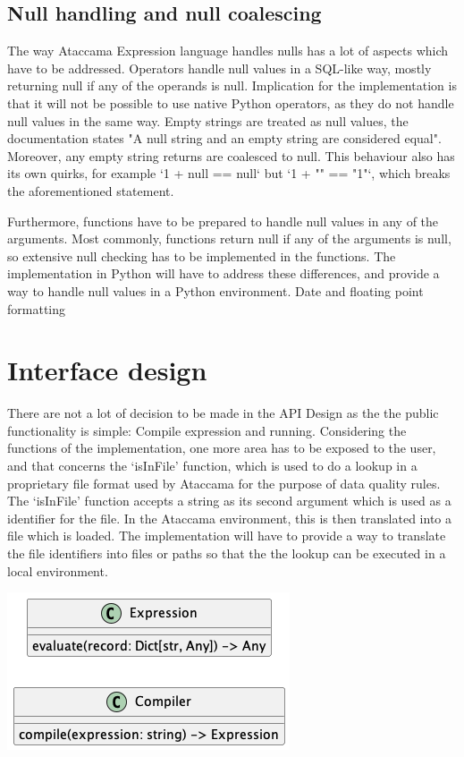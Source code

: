 \subsection{Null handling and null coalescing}
The way Ataccama Expression language handles nulls has a lot of aspects
which have to be addressed.
Operators handle null values in a SQL-like way, mostly returning null if any
of the operands is null. Implication for the implementation is that it will not be
possible to use native Python operators, as they do not handle null values in the
same way.
Empty strings are treated as null values, the documentation states "A null
string and an empty string are considered equal". Moreover, any empty string
returns are coalesced to null. This behaviour also has its own quirks, for example
‘1 + null == null‘ but ‘1 + "" == "1"‘, which breaks the aforementioned statement.

Furthermore, functions have to be prepared to handle null values in any of the
arguments. Most commonly, functions return null if any of the arguments is null,
so extensive null checking has to be implemented in the functions.
The implementation in Python will have to address these differences, and
provide a way to handle null values in a Python environment.
Date and floating point formatting

\section{Interface design}

There are not a lot of decision to be made in the API Design as the the public
functionality is simple: Compile expression and running.
Considering the functions of the implementation, one more area has to be
exposed to the user, and that concerns the ‘isInFile’ function, which is used to
do a lookup in a proprietary file format used by Ataccama for the purpose of
data quality rules. The ‘isInFile’ function accepts a string as its second argument
which is used as a identifier for the file. In the Ataccama environment, this is then
translated into a file which is loaded. The implementation will have to provide a
way to translate the file identifiers into files or paths so that the the lookup can
be executed in a local environment.

\includegraphics{diagrams/api_design-class.png}





